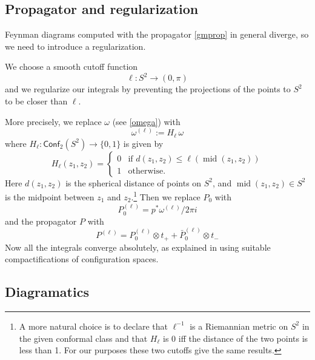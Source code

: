 \documentclass[a4paper]{amsart}
\theoremstyle{plain}
\theoremstyle{definition}
\newcommand{\on}{\operatorname}
\newcommand{\g}{\mathfrak{g}}
\newcommand{\h}{\mathfrak{h}}
\newcommand{\cf}{\mathsf{Conf}}
\begin{document}

\subsection{Propagator and regularization}

 Feynman diagrams computed with the propagator \eqref{gmprop} in general diverge, so we need to introduce a regularization.

We choose a smooth cutoff function
$$\ell:S^2\to(0,\pi)$$ and  we regularize our integrals by preventing the projections of the points to $S^2$ to be closer than $\ell$.

More precisely, we replace $\omega$ (see \eqref{omega}) with
$$\omega^{(\ell)}:=H_\ell\, \omega$$
where $H_\ell:\cf_2(S^2)\to\{0,1\}$ is given by
$$
H_\ell(z_1,z_2)=
\begin{cases}
0 & \text{if } d(z_1,z_2)\leq \ell(\on{mid}(z_1,z_2))\\
1 & \text{otherwise.}
\end{cases}
$$
Here $d(z_1,z_2)$ is the spherical distance of points on $S^2$, and $\on{mid}(z_1,z_2)\in S^2$ is the midpoint between $z_1$ and $z_2$.\footnote{%
A more natural choice is to declare that $\ell^{-1}$ is a Riemannian metric on $S^2$ in the given conformal class and that $H_\ell$ is 0 iff the distance of the two points is less than 1. For our purposes these two cutoffs give the same results.}
Then we replace $P_0$ with
$$P_0^{(\ell)}=p^*\omega^{(\ell)}/2\pi i$$
and the propagator $P$ with
$$P^{(\ell)}=P_0^{(\ell)}\otimes t_+ + \bar P_0^{(\ell)}\otimes t_-$$
 Now all the integrals converge absolutely, as explained in \cite{AS,K} using suitable compactifications of configuration spaces.

\subsection{Diagramatics}
\end{document}
